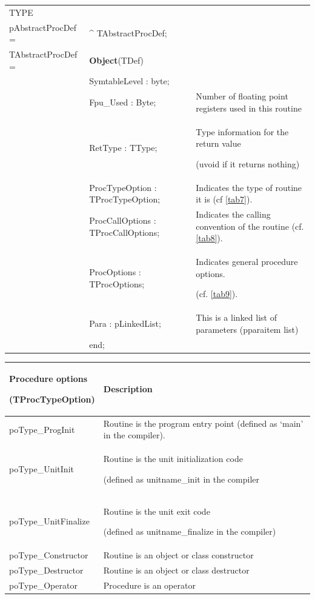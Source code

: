 \documentclass [a4paper,12pt]{article}
\begin{document}
\begin{tabular*}{6.5in}{|l@{\extracolsep{\fill}}lp{5.5cm}|}
\hline
\textsf{TYPE}& & \\
\xspace pAbstractProcDef = & \^{}  TAbstractProcDef; & \\
\xspace \textsf{TAbstractProcDef} = & \textbf{Object}(TDef) & \\
&\textsf{SymtableLevel : byte;}&  \\
&\textsf{Fpu{\_}Used : Byte;}&
	Number of floating point registers used in this routine  \\
&\textsf{RetType : TType;}&
	Type information for the return value \par (uvoid if it returns nothing) \\
&\textsf{ProcTypeOption : TProcTypeOption;} &
	Indicates the type of routine it is (cf \ref{tab7}). \\
&\textsf{ProcCallOptions : TProcCallOptions;} &
	Indicates the calling convention of the routine (cf. \ref{tab8}). \\
&\textsf{ProcOptions : TProcOptions;}&
	Indicates general procedure options.  \par (cf. \ref{tab9}). \\
&\textsf{Para : pLinkedList;}&
	This is a linked list of parameters (pparaitem list) \\
&\textsf{end;}&  \\
\hline
\end{tabular*}

\begin{longtable}{|l|p{10cm}|}
\hline
Procedure options  \par (TProcTypeOption)& Description \\
\hline
\endhead
\hline
\endfoot
\textsf{poType{\_}ProgInit}&
	Routine is the program entry point (defined as `\textsf{main}' in
	the compiler). \\
\textsf{poType{\_}UnitInit}&
	Routine is the unit initialization code \par (defined as
	unitname\textsf{{\_}init} in the compiler \\
\textsf{poType{\_}UnitFinalize}&
	Routine is the unit exit code \par (defined as
	unitname\textsf{{\_}finalize} in the compiler) \\
\textsf{poType{\_}Constructor}&
	Routine is an object or class constructor \\
\textsf{poType{\_}Destructor}&
	Routine is an object or class destructor \\
\textsf{poType{\_}Operator}&
	Procedure is an operator \\
\end{longtable}
\end{document}
